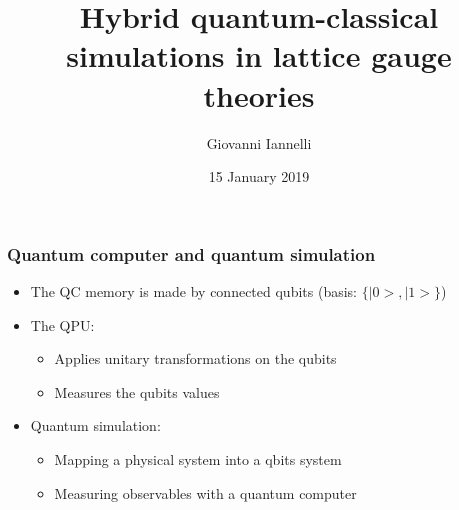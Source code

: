 \documentclass[10pt,t,xcolor=dvipsnames,aspectratio=169]{beamer}
\title[Fellow project]{Hybrid quantum-classical simulations in lattice gauge theories}
\author{Giovanni Iannelli}
\institute{Humboldt University of Berlin}
\date{15 January 2019}
\newlength\leftsidebar
\begin{document}
\leftsidebar
\begin{frame}[plain,t]
\titlepage
\end{frame}
\hoffset=0in %




\begin{frame}
    \frametitle{Quantum computer and quantum simulation}
    \begin{itemize}
        \item
            The QC memory is made by connected qubits (basis: $\{|0>,|1>\}$)
        \item
            The QPU:
            \begin{itemize}
                \item Applies unitary transformations on the qubits
                \item Measures the qubits values
            \end{itemize}
        \item
            Quantum simulation:
            \begin{itemize}
                \item
                    Mapping a physical system into a qbits system
                \item
                    Measuring observables with a quantum computer
            \end{itemize}
    \end{itemize}
\end{frame}
\end{document}
